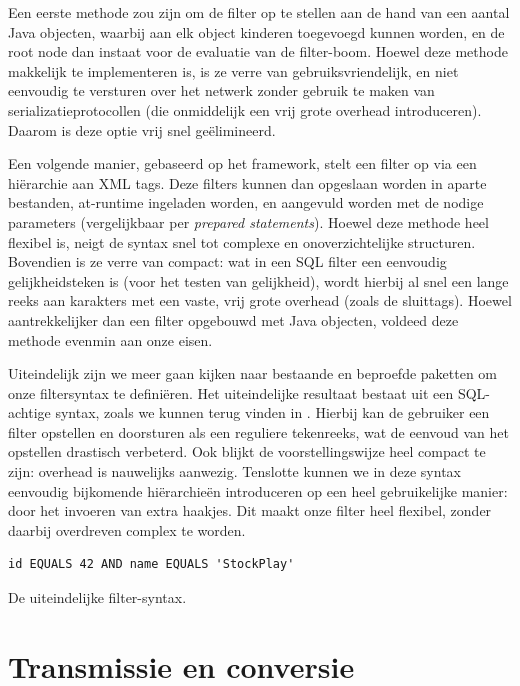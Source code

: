 Een eerste methode zou zijn om de filter op te stellen aan de hand van een aantal Java objecten, waarbij aan elk object kinderen toegevoegd kunnen worden, en de root node dan instaat voor de evaluatie van de filter-boom. Hoewel deze methode makkelijk te implementeren is, is ze verre van gebruiksvriendelijk, en niet eenvoudig te versturen over het netwerk zonder gebruik te maken van serializatieprotocollen (die onmiddelijk een vrij grote overhead introduceren). Daarom is deze optie vrij snel ge\"elimineerd.

Een volgende manier, gebaseerd op het  framework, stelt een filter op via een hi\"erarchie aan XML tags. Deze filters kunnen dan opgeslaan worden in aparte bestanden, at-runtime ingeladen worden, en aangevuld worden met de nodige parameters (vergelijkbaar per \emph{prepared statements}). Hoewel deze methode heel flexibel is, neigt de syntax snel tot complexe en onoverzichtelijke structuren. Bovendien is ze verre van compact: wat in een SQL filter een eenvoudig gelijkheidsteken is (voor het testen van gelijkheid), wordt hierbij al snel een lange reeks aan karakters met een vaste, vrij grote overhead (zoals de sluittags). Hoewel aantrekkelijker dan een filter opgebouwd met Java objecten, voldeed deze methode evenmin aan onze eisen.

Uiteindelijk zijn we meer gaan kijken naar bestaande en beproefde paketten om onze filtersyntax te definiëren. Het uiteindelijke resultaat bestaat uit een SQL-achtige syntax, zoals we kunnen terug vinden in . Hierbij kan de gebruiker een filter opstellen en doorsturen als een reguliere tekenreeks, wat de eenvoud van het opstellen drastisch verbeterd. Ook blijkt de voorstellingswijze heel compact te zijn: overhead is nauwelijks aanwezig. Tenslotte kunnen we in deze syntax eenvoudig bijkomende hi\"erarchie\"en introduceren op een heel gebruikelijke manier: door het invoeren van extra haakjes. Dit maakt onze filter heel flexibel, zonder daarbij overdreven complex te worden.

\begin{code}
\begin{verbatim}
id EQUALS 42 AND name EQUALS 'StockPlay'
\end{verbatim}
\caption{De uiteindelijke filter-syntax.}
\end{code}

\section{Transmissie en conversie}

